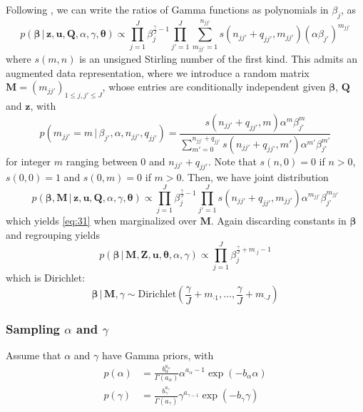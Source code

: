 \documentclass[12pt,letterpaper]{report}
\newcommand{\given}{\, \vert \,}
\newcommand{\bM}{\mathbf{M}}
\newcommand{\bQ}{\mathbf{Q}}
\newcommand{\bz}{\mathbf{z}}
\newcommand{\bZ}{\mathbf{Z}}
\newcommand{\bu}{\mathbf{u}}
\newcommand{\bbeta}{\boldsymbol{\beta}}
\newcommand{\btheta}{\boldsymbol{\theta}}
\begin{document}
Following \citep{teh2006hierarchical}, we can write the ratios of Gamma functions
as polynomials in $\beta_j$, as
\begin{equation}
  \label{eq:31}
  p(\bbeta \given \bz, \bu, \bQ, \alpha, \gamma, \btheta) \propto \prod_{j=1}^J
  \beta_j^{\frac{\gamma}{J} - 1} \prod_{j'=1}^{J} \sum_{m_{jj'} = 1}^{n_{jj'}}
  s(n_{jj'} + q_{jj'}, m_{jj'}) (\alpha \beta_{j'})^{m_{jj'}}
\end{equation}
where $s(m,n)$ is an unsigned Stirling number of the first kind.
This admits an augmented data representation, where we introduce a
random matrix $\bM = (m_{jj'})_{1 \leq j,j' \leq J}$, whose
entries are conditionally independent given $\bbeta$, $\bQ$ and $\bz$, with
\begin{equation}
  \label{eq:32}
  p(m_{jj'} = m \given \beta_{j'}, \alpha, n_{jj'}, q_{jj'}) =
  \frac{s(n_{jj'} + q_{jj'}, m) \alpha^{m}
    \beta_{j'}^{m}}{\sum_{m'=0}^{n_{jj'} + q_{jj'}} s(n_{jj'} +
  q_{jj'}, m') \alpha^{m'} \beta_{j'}^{m'}}
\end{equation}
for integer $m$ ranging between $0$ and $n_{jj'} + q_{jj'}$.  Note
that $s(n,0) = 0$ if $n > 0$, $s(0,0) = 1$ and $s(0,m) = 0$ if $m > 0$.
Then, we have joint distribution
\begin{equation}
  \label{eq:33}
  p(\bbeta, \bM \given \bz, \bu, \bQ, \alpha, \gamma, \btheta) \propto \prod_{j=1}^J
  \beta_j^{\frac{\gamma}{J} - 1} \prod_{j'=1}^{J} s(n_{jj'} + q_{jj'}, m_{jj'}) \alpha^{m_{jj'}} \beta_{j'}^{m_{jj'}}
\end{equation}
which yields \eqref{eq:31} when marginalized over $\bM$.  Again discarding
constants in $\bbeta$ and regrouping yields
\begin{equation}
  \label{eq:34}
  p(\bbeta \given \bM, \bZ, \bu, \btheta, \alpha, \gamma) \propto \prod_{j=1}^J
  \beta_j^{\frac{\gamma}{J} + m_{\cdot j}- 1}
\end{equation}
which is Dirichlet:
\begin{equation}
  \label{eq:38}
  \bbeta \given \bM, \gamma \sim \mathrm{Dirichlet}(\frac{\gamma}{J} +
  m_{\cdot 1}, \dots, \frac{\gamma}{J} + m_{\cdot J})
\end{equation}

\subsubsection{Sampling $\alpha$ and $\gamma$}
\label{sec:sampling-alpha}
Assume that $\alpha$ and $\gamma$ have Gamma priors, with
\begin{align}
  \label{eq:42}
  p(\alpha) &= \frac{b_{\alpha}^{a_{\alpha}}}{\Gamma(a_{\alpha})}
  \alpha^{a_{\alpha} - 1} \exp(-b_{\alpha}\alpha) \\
  p(\gamma) &= \frac{b_{\gamma}^{a_\gamma}}{\Gamma(a_{\gamma})}
  \gamma^{a_{\gamma - 1}} \exp(-b_{\gamma}\gamma)
\end{align}
\end{document}
